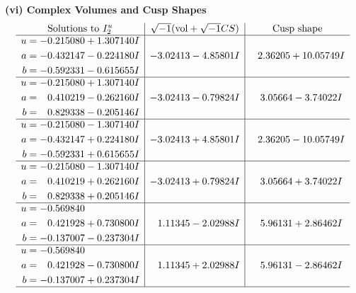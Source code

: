 \documentclass[1p]{elsarticle_modified}
\theoremstyle{definition}
\newcommand{\I}{\sqrt{-1}}
\begin{document}
\newpage\flushleft \textbf{(vi) Complex Volumes and Cusp Shapes}
$$\begin{array}{c|c|c}  
\text{Solutions to }I^u_{2}& \I (\text{vol} + \sqrt{-1}CS) & \text{Cusp shape}\\
 \hline 
\begin{aligned}
u &= -0.215080 + 1.307140 I \\
a &= -0.432147 - 0.224180 I \\
b &= -0.592331 - 0.615655 I\end{aligned}
 & -3.02413 - 4.85801 I & \phantom{-}2.36205 + 10.05749 I \\ \hline\begin{aligned}
u &= -0.215080 + 1.307140 I \\
a &= \phantom{-}0.410219 - 0.262160 I \\
b &= \phantom{-}0.829338 - 0.205146 I\end{aligned}
 & -3.02413 - 0.79824 I & \phantom{-}3.05664 - 3.74022 I \\ \hline\begin{aligned}
u &= -0.215080 - 1.307140 I \\
a &= -0.432147 + 0.224180 I \\
b &= -0.592331 + 0.615655 I\end{aligned}
 & -3.02413 + 4.85801 I & \phantom{-}2.36205 - 10.05749 I \\ \hline\begin{aligned}
u &= -0.215080 - 1.307140 I \\
a &= \phantom{-}0.410219 + 0.262160 I \\
b &= \phantom{-}0.829338 + 0.205146 I\end{aligned}
 & -3.02413 + 0.79824 I & \phantom{-}3.05664 + 3.74022 I \\ \hline\begin{aligned}
u &= -0.569840\phantom{ +0.000000I} \\
a &= \phantom{-}0.421928 + 0.730800 I \\
b &= -0.137007 - 0.237304 I\end{aligned}
 & \phantom{-}1.11345 - 2.02988 I & \phantom{-}5.96131 + 2.86462 I \\ \hline\begin{aligned}
u &= -0.569840\phantom{ +0.000000I} \\
a &= \phantom{-}0.421928 - 0.730800 I \\
b &= -0.137007 + 0.237304 I\end{aligned}
 & \phantom{-}1.11345 + 2.02988 I & \phantom{-}5.96131 - 2.86462 I\\
 \hline 
 \end{array}$$\newpage
\end{document}
